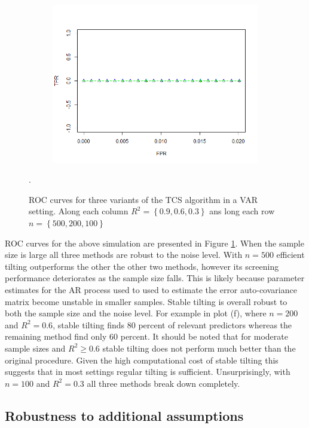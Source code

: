 \documentclass[11pt]{report}\usepackage[utf8]{inputenc}
\begin{document}
\begin{figure}[h]
\begin{subfigure}[b]{0.3\textwidth}
        \includegraphics[width=\textwidth]{../plots/200sampe03}
        \caption{}
    \end{subfigure}
    \caption{ROC curves for three variants of the TCS algorithm in a VAR setting. Along each column $R^2 = \left \{ 0.9,0.6,0.3 \right \}$ ans long each row $n = \left \{ 500, 200, 100 \right \}$}.
    \label{general ROC plots}
\end{figure}

ROC curves for the above simulation are presented in Figure \ref{general ROC plots}. When the sample size is large all three methods are robust to the noise level. With $n = 500$ efficient tilting outperforms the other the other two methods, however its screening performance deteriorates as the sample size falls. This is likely because parameter estimates for the AR process used to used to estimate the error auto-covariance matrix become unstable in smaller samples. Stable tilting is overall robust to both the sample size and the noise level. For example in plot (f), where $n=200$ and $R^2=0.6$, stable tilting finds 80 percent of relevant predictors whereas the remaining method find only 60 percent. It should be noted that for moderate sample sizes and $R^2 \geq 0.6$ stable tilting does not perform much better than the original procedure. Given the high computational cost of stable tilting this suggests that in most settings regular tilting is sufficient. Unsurprisingly, with $n = 100$ and $R^2 = 0.3$ all three methods break down completely. 

\subsection{Robustness to additional assumptions}\label{robustness tests}
\end{document}

